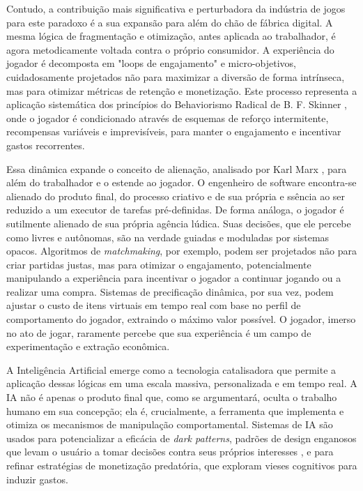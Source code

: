 Contudo, a contribuição mais significativa e perturbadora da indústria de jogos para este paradoxo é a sua expansão para além do 
chão de fábrica digital. A mesma lógica de fragmentação e otimização, antes aplicada ao trabalhador, é agora metodicamente voltada 
contra o próprio consumidor. A experiência do jogador é decomposta em "loops de engajamento" e micro-objetivos, cuidadosamente 
projetados não para maximizar a diversão de forma intrínseca, mas para otimizar métricas de retenção e monetização. Este processo 
representa a aplicação sistemática dos princípios do Behaviorismo Radical de B. F. Skinner \cite{DelpratoMidgley1992}, onde o jogador é condicionado através de 
esquemas de reforço intermitente, recompensas variáveis e imprevisíveis, para manter o engajamento e incentivar gastos recorrentes.

Essa dinâmica expande o conceito de alienação, analisado por Karl Marx \cite{Marx1844}, para além do trabalhador e o estende ao jogador. O engenheiro 
de software encontra-se alienado do produto final, do processo criativo e de sua própria e  ssência ao ser reduzido a um executor de 
tarefas pré-definidas. De forma análoga, o jogador é sutilmente alienado de sua própria agência lúdica. Suas decisões, que ele 
percebe como livres e autônomas, são na verdade guiadas e moduladas por sistemas opacos. Algoritmos de \textit{matchmaking}, por exemplo, 
podem ser projetados não para criar partidas justas, mas para otimizar o engajamento, potencialmente manipulando a experiência para 
incentivar o jogador a continuar jogando ou a realizar uma compra. Sistemas de precificação dinâmica, por sua vez, podem ajustar o 
custo de itens virtuais em tempo real com base no perfil de comportamento do jogador, extraindo o máximo valor possível. O jogador, 
imerso no ato de jogar, raramente percebe que sua experiência é um campo de experimentação e extração econômica.

A Inteligência Artificial emerge como a tecnologia catalisadora que permite a aplicação dessas lógicas em uma escala massiva, 
personalizada e em tempo real. A IA não é apenas o produto final que, como se argumentará, oculta o trabalho humano em sua concepção; 
ela é, crucialmente, a ferramenta que implementa e otimiza os mecanismos de manipulação comportamental. Sistemas de IA são usados 
para potencializar a eficácia de \textit{dark patterns}, padrões de design enganosos que levam o usuário a tomar decisões contra seus 
próprios interesses \cite{Brignull2023Deceptive}, e para refinar estratégias de monetização predatória, que exploram vieses cognitivos para induzir gastos.

